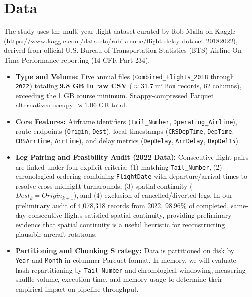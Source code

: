 \documentclass{article}
\begin{document}
\section{Data}
The study uses the multi-year flight dataset curated by Rob Mulla on Kaggle (\url{https://www.kaggle.com/datasets/robikscube/flight-delay-dataset-20182022}), derived from official U.S. Bureau of Transportation Statistics (BTS) Airline On-Time Performance reporting (14 CFR Part 234).
\begin{itemize}
    \item \textbf{Type and Volume:} Five annual files (\texttt{Combined\_Flights\_2018} through \texttt{2022}) totaling \textbf{9.8 GB in raw CSV} ($\approx 31.7$ million records, 62 columns), exceeding the 1 GB course minimum. Snappy-compressed Parquet alternatives occupy $\approx 1.06$ GB total.
    \item \textbf{Core Features:} Airframe identifiers (\texttt{Tail\_Number}, \texttt{Operating\_Airline}), route endpoints (\texttt{Origin}, \texttt{Dest}), local timestamps (\texttt{CRSDepTime}, \texttt{DepTime}, \texttt{CRSArrTime}, \texttt{ArrTime}), and delay metrics (\texttt{DepDelay}, \texttt{ArrDelay}, \texttt{DepDel15}).
    \item \textbf{Leg Pairing and Feasibility Audit (2022 Data):} Consecutive flight pairs are linked under four explicit criteria: (1) matching \texttt{Tail\_Number}, (2) chronological ordering combining \texttt{FlightDate} with departure/arrival times to resolve cross-midnight turnarounds, (3) spatial continuity ($Dest_k = Origin_{k+1}$), and (4) exclusion of cancelled/diverted legs. In our preliminary audit of 4,078,318 records from 2022, 98.96\% of completed, same-day consecutive flights satisfied spatial continuity, providing preliminary evidence that spatial continuity is a useful heuristic for reconstructing plausible aircraft rotations.
    \item \textbf{Partitioning and Chunking Strategy:} Data is partitioned on disk by \texttt{Year} and \texttt{Month} in columnar Parquet format. In memory, we will evaluate hash-repartitioning by \texttt{Tail\_Number} and chronological windowing, measuring shuffle volume, execution time, and memory usage to determine their empirical impact on pipeline throughput.
\end{itemize}
\end{document}
